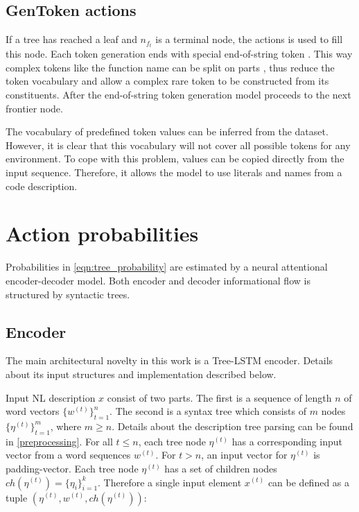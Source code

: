 \subsection{GenToken actions} \label{gentoken}
If a tree has reached a leaf and $n_{f_t}$ is a terminal node, the  actions is used to fill this node. Each token generation ends with special end-of-string token . This way complex tokens like the function name  can be split on parts , thus reduce the token vocabulary and allow a complex rare token to be constructed from its constituents. After the end-of-string token generation model proceeds to the next frontier node.

The vocabulary of predefined token values can be inferred from the dataset. However, it is clear that this vocabulary will not cover all possible tokens for any environment. To cope with this problem, values can be copied directly from the input sequence. Therefore, it allows the model to use literals and names from a code description.

\section{Action probabilities}
Probabilities in \cref{eqn:tree_probability} are estimated by a neural attentional encoder-decoder model. Both encoder and decoder informational flow is structured by syntactic trees. 

\subsection{Encoder}
The main architectural novelty in this work is a Tree-LSTM encoder. Details about its input structures and implementation described below.

Input NL description $x$ consist of two parts. The first is a sequence of length $n$ of word vectors $\{w^{(t)}\}^n_{t=1}$. The second is a syntax tree which consists of $m$ nodes $\{\eta^{(t)}\}^m_{t=1}$, where $m\geq n$. Details about the description tree parsing can be found in \cref{preprocessing}. For all $t \leq n$, each tree node $\eta^{(t)}$ has a corresponding input vector from a word sequences $w^{(t)}$. For $t > n$, an input vector for $\eta^{(t)}$ is padding-vector. Each tree node $\eta^{(t)}$ has a set of children nodes $ch(\eta^{(t)})=\{\eta_{i}\}^k_{i=1}$. Therefore a single input element $x^{(t)}$ can be defined as a tuple $(\eta^{(t)}, w^{(t)}, ch(\eta^{(t)}))$:

